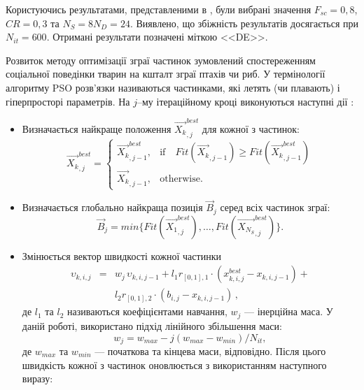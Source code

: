 Користуючись результатами, представленими в \cite{DEWang},
були вибрані значення $F_{sc}=0,8$, $C\!R=0,3$ та $N_S=8N_D=24$.
Виявлено, що збіжність результатів досягається при $N_{it}=600$.
Отримані результати позначені міткою <<DE>>.

Розвиток методу оптимізації зграї частинок зумовлений спостереженням соціальної поведінки тварин на кшталт зграї птахів чи риб.
У термінології алгоритму PSO розв'язки називаються частинками, які летять (чи плавають) і гіперпросторі параметрів.
На $j$--му ітераційному кроці виконуються наступні дії \cite{PSO_Ye}:
\begin{itemize}[leftmargin=0cm,itemindent=1em]
  \item Визначається найкраще положення $\overrightarrow{X_k}_{,j}^{best}$ для кожної з частинок:
 \begin{equation}
 \label{eqPSO_PB}
 \overrightarrow{X_k}_{,j}^{best}=\left\{
 \begin{array}{ll}
 \overrightarrow{X_k}_{,j-1}^{best},& \text{if} \quad Fit(\overrightarrow{X_k}_{,j-1})\geq Fit(\overrightarrow{X_k}_{,j-1}^{best})\\
 \overrightarrow{X_{k}}_{,j-1},& \text{otherwise}.
 \end{array}
 \right.
 \end{equation}
  \item  Визначається глобально найкраща позиція $\overrightarrow{B}_{j}$ серед всіх частинок зграї:
 \begin{equation}
 \label{eqPSO_GB}
 \overrightarrow{B}_{j}=min\{ Fit(\overrightarrow{X_1}_{,j}^{best}),\ldots, Fit(\overrightarrow{X_{N_S}}_{,j}^{best})\}.
 \end{equation}
  \item Змінюється вектор швидкості кожної частинки
\begin{eqnarray}
 \label{eqPSO_Vel}
\upsilon_{k,i,j}&=&w_j\,\upsilon_{k,i,j-1}+l_1r_{[0,1],1}\cdot(x_{k,i,j}^{best}-x_{k,i,j-1})+
\nonumber\\
&&l_2r_{[0,1],2}\cdot(b_{i,j}-x_{k,i,j-1})
\,,
\end{eqnarray}
де
$l_1$ та $l_2$ називаються коефіцієнтами навчання, $w_j$ --- інерційна маса.
У даній роботі, використано підхід лінійного збільшення маси:
 \begin{equation}
 \label{eqPSO_W}
 w_j=w_{max}-j(w_{max}-w_{min})/N_{it},
 \end{equation}
де
$w_{max}$ та $w_{min}$ --- початкова та кінцева маси, відповідно.
Після цього швидкість кожної з частинок оновлюється з використанням наступного виразу:

\end{itemize}
